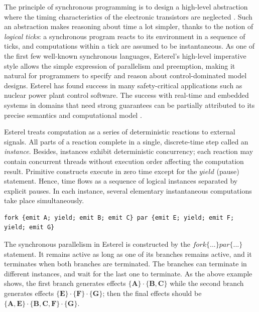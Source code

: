 \documentclass[acmsmall,review,anonymous]{acmart}\settopmatter{printfolios=true,printccs=false,printacmref=false}
\newcommand{\code}[1]{{\tt{\ensuremath{\m{#1}}}}}
\newcommand{\m}{\mathit}
\begin{document}
The principle of synchronous programming is to design a high-level abstraction where the timing characteristics of the electronic transistors are neglected \cite{esterel_wiki}. Such an abstraction makes reasoning about time a lot simpler, thanks to the notion of \emph{logical ticks}: a synchronous program reacts to its environment in a sequence of ticks, and computations within a tick are assumed to be instantaneous. 
As one of the first few well-known synchronous languages, Esterel's high-level imperative style allows the simple expression of parallelism and preemption, making it natural for programmers to specify and reason about control-dominated model designs. Esterel has found success in many safety-critical applications such as nuclear power plant control software. The success with real-time and embedded systems in domains that need strong guarantees can be partially attributed to its precise semantics and computational model  \cite{berry1992esterel,berry1999constructive, song2021synchronous}. 

Esterel treats computation as a series of deterministic reactions to external signals. All parts of a reaction complete in a single, discrete-time step called an \emph{instance}. Besides, instances exhibit deterministic concurrency; each reaction may contain concurrent threads without execution order affecting the computation result. Primitive constructs execute in zero time except for the \code{yield} (pause) statement. Hence, time flows as a sequence of logical instances separated by explicit pauses. In each instance, several elementary instantaneous computations take place simultaneously. 


\begin{lstlisting}
fork {emit A; yield; emit B; emit C} par {emit E; yield; emit F; yield; emit G}
\end{lstlisting}  


The synchronous parallelism in Esterel is constructed by the \code{\m{fork} \{...\} \m{par}  \{...\}  } statement. 
It remains active as long as one of its branches remains active, 
and it terminates when both branches are terminated. The branches can terminate in different instances, and wait for the last one to terminate.
As the above example shows, the first branch generates effects $\{\textbf{A}\} \cdot \{\textbf{B}, \textbf{C}\}$ while the second branch generates effects $\{\textbf{E}\} \cdot \{\textbf{F}\} \cdot \{\textbf{G}\}$; then the final effects should be $\{\textbf{A},\textbf{E}\}\cdot \{\textbf{B}, \textbf{C}, \textbf{F}\} \cdot \{\textbf{G}\}$. 
\end{document}
